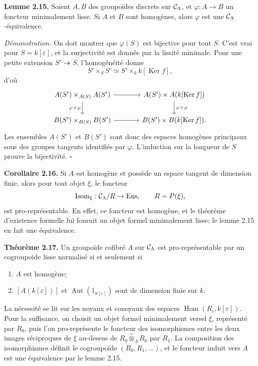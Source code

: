 \documentclass[11pt]{article}
\providecommand{\Aut}{\operatorname{Aut}}
\providecommand{\Isom}{\operatorname{Isom}}
\providecommand{\Ker}{\operatorname{Ker}}
\providecommand{\Hom}{\operatorname{Hom}}
\providecommand{\Isom}{\operatorname{Isom}}
\begin{document}
\textbf{Lemme 2.15.}  Soient \(A,B\) des groupoïdes discrets sur \(\mathcal C_\Lambda\), et \(\varphi:A\to B\) un foncteur minimalement lisse.  Si \(A\) et \(B\) sont homogènes, alors \(\varphi\) est une \(\mathcal C_\Lambda\)-équivalence.

\textit{Démonstration.}  On doit montrer que \(\varphi(S)\) est bijective pour tout \(S\).  C'est vrai pour \(S=k[\varepsilon]\), et la surjectivité est donnée par la lissité minimale.  Pour une petite extension \(S'\twoheadrightarrow S\), l'homogénéité donne
\[
S'\times_SS'\simeq S'\times_k k[\Ker f],
\]
d'où
\[
\begin{tikzcd}[column sep=large]
 A(S')\times_{A(S)}A(S') \arrow[r] \arrow[d,"\varphi\times\varphi"'] & A(S')\times A(k[\Ker f]) \arrow[d,"\varphi\times\varphi"] \\
 B(S')\times_{B(S)}B(S') \arrow[r] & B(S')\times B(k[\Ker f]).
\end{tikzcd}
\]
Les ensembles \(A(S')\) et \(B(S')\) sont donc des espaces homogènes principaux sous des groupes tangents identifiés par \(\varphi\).  L'induction sur la longueur de \(S\) prouve la bijectivité. \(\square\)

\textbf{Corollaire 2.16.}  Si \(A\) est homogène et possède un espace tangent de dimension finie, alors pour tout objet \(\xi\), le foncteur
\[
\Isom_\xi:\cC_\Lambda/R\to\mathrm{Ens},\qquad R=P(\xi),
\]
est pro-représentable.  En effet, ce foncteur est homogène, et le théorème d'existence formelle lui fournit un objet formel minimalement lisse; le lemme 2.15 en fait une équivalence.

\textbf{Théorème 2.17.}  Un groupoïde cofibré \(A\) sur \(\mathcal C_\Lambda\) est pro-représentable par un cogroupoïde lisse normalisé si et seulement si
\begin{enumerate}[label=\textup{(\arabic*)}]
\item \(A\) est homogène;
\item \([A(k[\varepsilon])]\) et \(\Aut(1_{k[\varepsilon]})\) sont de dimension finie sur \(k\).
\end{enumerate}
La nécessité se lit sur les noyaux et conoyaux des espaces \(\Hom(R_i,k[\varepsilon])\).  Pour la suffisance, on choisit un objet formel minimalement versel \(\xi\), représenté par \(R_0\), puis l'on pro-représente le foncteur des isomorphismes entre les deux images réciproques de \(\xi\) au-dessus de \(R_0\widehat\otimes_\Lambda R_0\) par \(R_1\).  La composition des isomorphismes définit le cogroupoïde \((R_0,R_1,\ldots)\), et le foncteur induit vers \(A\) est une équivalence par le lemme 2.15.
\end{document}
